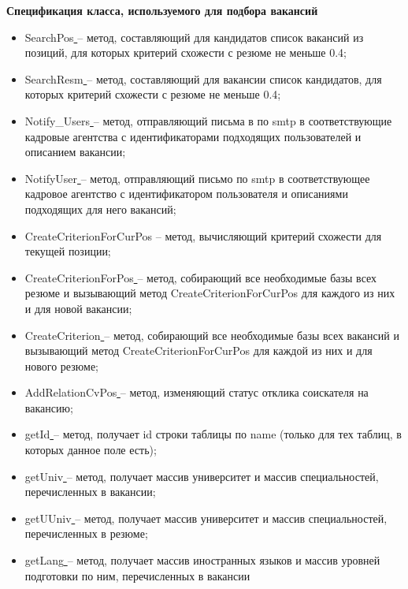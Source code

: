 \textbf{Спецификация класса, используемого для подбора вакансий}
\begin{itemize}
\item \underline{ }\underline{ }SearchPos\underline{ }\underline{ } – метод, составляющий для кандидатов список вакансий из позиций, для которых критерий схожести с резюме не меньше 0.4;
\item \underline{ }\underline{ }SearchResm\underline{ }\underline{ } – метод, составляющий для вакансии список кандидатов, для которых критерий схожести с резюме не меньше 0.4;
\item \underline{ }\underline{ }Notify_Users\underline{ }\underline{ } – метод, отправляющий письма в по smtp в соответствующие кадровые агентства с идентификаторами подходящих пользователей и описанием вакансии;
\item \underline{ }\underline{ }NotifyUser\underline{ }\underline{ } – метод, отправляющий письмо по smtp в соответствующее кадровое агентство с идентификатором пользователя и описаниями подходящих для него вакансий;
\item \underline{ }\underline{ }CreateCriterionForCurPos – метод, вычисляющий критерий схожести для текущей позиции;
\item \underline{ }\underline{ }CreateCriterionForPos\underline{ }\underline{ } – метод, собирающий все необходимые базы всех резюме и вызывающий метод  \underline{ }\underline{ }CreateCriterionForCurPos для каждого из них и для новой вакансии;
\item \underline{ }\underline{ }CreateCriterion\underline{ }\underline{ } – метод, собирающий все необходимые базы всех вакансий и вызывающий метод  \underline{ }\underline{ }CreateCriterionForCurPos для каждой из них и для нового резюме;
\item \underline{ }\underline{ }AddRelationCvPos\underline{ }\underline{ } – метод, изменяющий статус отклика соискателя на вакансию;
\item \underline{ }\underline{ }getId\underline{ }\underline{ } – метод, получает id строки таблицы по name (только для тех таблиц, в которых данное поле есть);
\item \underline{ }\underline{ }getUniv\underline{ }\underline{ } – метод, получает массив университет и массив специальностей, перечисленных в вакансии;
\item \underline{ }\underline{ }getUUniv\underline{ }\underline{ } – метод, получает массив университет и массив специальностей, перечисленных в резюме;
\item \underline{ }\underline{ }getLang\underline{ }\underline{ } – метод, получает массив иностранных языков и массив уровней подготовки по ним, перечисленных в вакансии 

\end{itemize}
